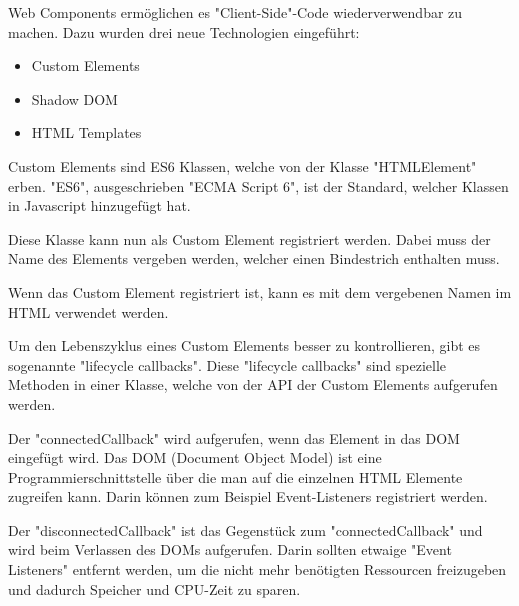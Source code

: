 
Web Components ermöglichen es "Client-Side"-Code wiederverwendbar zu machen. Dazu wurden drei neue Technologien \cite{MDNWebComponents} eingeführt:

\begin{itemize}
    \item Custom Elements
    \item Shadow DOM
    \item HTML Templates
\end{itemize}




Custom Elements sind ES6 Klassen, welche von der Klasse "HTMLElement" erben. "ES6", ausgeschrieben "ECMA Script 6", ist der Standard, welcher Klassen in Javascript hinzugefügt hat.\cite{MDNes6Classes}


Diese Klasse kann nun als Custom Element registriert werden. Dabei muss der Name des Elements vergeben werden, welcher einen Bindestrich enthalten muss.


Wenn das Custom Element registriert ist, kann es mit dem vergebenen Namen im HTML verwendet werden.



Um den Lebenszyklus eines Custom Elements besser zu kontrollieren, gibt es sogenannte "lifecycle callbacks". Diese "lifecycle callbacks" sind spezielle Methoden in einer Klasse, welche von der API der Custom Elements aufgerufen werden.

Der "connectedCallback" wird aufgerufen, wenn das Element in das DOM eingefügt wird. Das DOM (Document Object Model) ist eine Programmierschnittstelle über die man auf die einzelnen HTML Elemente zugreifen kann. \cite{MDNDOM} Darin können zum Beispiel Event-Listeners registriert werden.

   
Der "disconnectedCallback" ist das Gegenstück zum "connectedCallback" und wird beim Verlassen des DOMs aufgerufen. Darin sollten etwaige "Event Listeners" entfernt werden, um die nicht mehr benötigten Ressourcen freizugeben und dadurch Speicher und CPU-Zeit zu sparen.  

